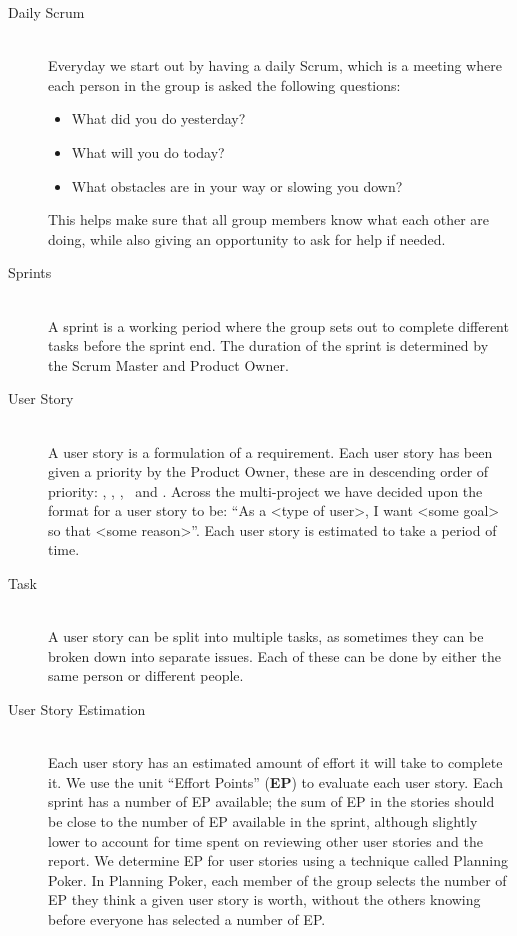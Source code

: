 \begin{description}
	\item[Daily Scrum] \hfill \\
	Everyday we start out by having a daily Scrum, which is a meeting where each person in the group is asked the following questions:
		\begin{itemize}
		    \item What did you do yesterday? 
			\item What will you do today?
			\item What obstacles are in your way or slowing you down?		
		\end{itemize}
		This helps make sure that all group members know what each other are doing, while also giving an opportunity to ask for help if needed.
	\item[Sprints] \hfill \\
	A sprint is a working period where the group sets out to complete different tasks before the sprint end. 
	The duration of the sprint is determined by the Scrum Master and Product Owner. 
	\item[User Story] \hfill \\
	A user story is a formulation of a requirement. 
	Each user story has been given a priority by the Product Owner, these are in descending order of priority: \pblocking, \phigh, \pnormal, \plow~and \pwish. 
	Across the multi-project we have decided upon the format for a user story to be: ``As a <type of user>, I want <some goal> so that <some reason>''.
	Each user story is estimated to take a period of time.
	\item[Task] \hfill \\
	A user story can be split into multiple tasks, as sometimes they can be broken down into separate issues.
	Each of these can be done by either the same person or different people. 
	\item[User Story Estimation] \hfill \\
	Each user story has an estimated amount of effort it will take to complete it. 
	We use the unit ``Effort Points'' (\textbf{EP}) to evaluate each user story.
	Each sprint has a number of EP available; the sum of EP in the stories should be close to the number of EP available in the sprint, although slightly lower to account for time spent on reviewing other user stories and the report. 
	We determine EP for user stories using a technique called Planning Poker.
	In Planning Poker, each member of the group selects the number of EP they think a given user story is worth, without the others knowing before everyone has selected a number of EP.

\end{description}
